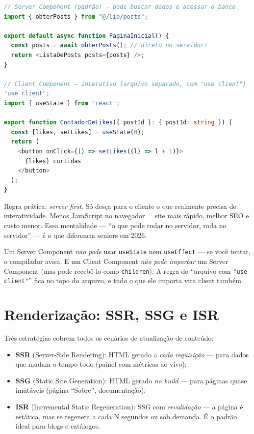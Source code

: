 \begin{lstlisting}[style=livro, language=TypeScript,
  caption={Server vs Client Components.}, label={list:nextjs-sc-cc}]
// Server Component (padrão) — pode buscar dados e acessar o banco
import { obterPosts } from "@/lib/posts";

export default async function PaginaInicial() {
  const posts = await obterPosts(); // direto no servidor!
  return <ListaDePosts posts={posts} />;
}

// Client Component — interativo (arquivo separado, com "use client")
"use client";
import { useState } from "react";

export function ContadorDeLikes({ postId }: { postId: string }) {
  const [likes, setLikes] = useState(0);
  return (
    <button onClick={() => setLikes((l) => l + 1)}>
      {likes} curtidas
    </button>
  );
}
\end{lstlisting}

\begin{caixadica}
Regra prática: \emph{server first}. Só desça para o cliente o que realmente
precisa de interatividade. Menos JavaScript no navegador = site mais rápido,
melhor SEO e custo menor. Essa mentalidade — ``o que pode rodar no servidor,
roda no servidor'' — é o que diferencia seniors em 2026.
\end{caixadica}

\begin{caixaarmadilha}
Um Server Component \emph{não pode} usar \texttt{useState} nem
\texttt{useEffect} — se você tentar, o compilador avisa. E um Client Component
\emph{não pode importar} um Server Component (mas pode recebê-lo como
\texttt{children}). A regra do ``arquivo com \texttt{"use client"}'' fica no
topo do arquivo, e tudo o que ele importa vira client também.
\end{caixaarmadilha}

\section{Renderização: SSR, SSG e ISR}

Três estratégias cobrem todos os cenários de atualização de conteúdo:

\begin{itemize}[leftmargin=*, itemsep=0.4em]
  \item \textbf{SSR} (Server-Side Rendering): HTML gerado a \emph{cada
  requisição} — para dados que mudam o tempo todo (painel com métricas ao vivo);
  \item \textbf{SSG} (Static Site Generation): HTML gerado \emph{no build} —
  para páginas quase imutáveis (página ``Sobre'', documentação);
  \item \textbf{ISR} (Incremental Static Regeneration): SSG com
  \emph{revalidação} — a página é estática, mas se regenera a cada N segundos
  ou sob demanda. É o padrão ideal para blogs e catálogos.
\end{itemize}

